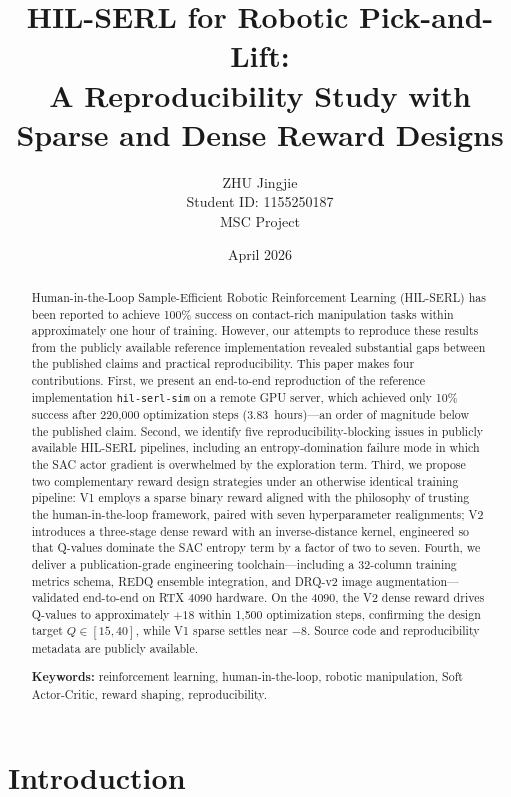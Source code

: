 \documentclass[12pt,a4paper]{article}
\title{\textbf{HIL-SERL for Robotic Pick-and-Lift:\\
A Reproducibility Study with Sparse and Dense Reward Designs}}
\author{ZHU Jingjie\\
\small Student ID: 1155250187\\
\small MSC Project}
\date{April 2026}
\begin{document}
\maketitle

\begin{abstract}
\noindent
Human-in-the-Loop Sample-Efficient Robotic Reinforcement Learning (HIL-SERL) has been reported to achieve 100\% success on contact-rich manipulation tasks within approximately one hour of training. However, our attempts to reproduce these results from the publicly available reference implementation revealed substantial gaps between the published claims and practical reproducibility. This paper makes four contributions. First, we present an end-to-end reproduction of the reference implementation \texttt{hil-serl-sim} on a remote GPU server, which achieved only 10\% success after 220{,}000 optimization steps (3.83~hours)---an order of magnitude below the published claim. Second, we identify five reproducibility-blocking issues in publicly available HIL-SERL pipelines, including an entropy-domination failure mode in which the SAC actor gradient is overwhelmed by the exploration term. Third, we propose two complementary reward design strategies under an otherwise identical training pipeline: V1 employs a sparse binary reward aligned with the philosophy of trusting the human-in-the-loop framework, paired with seven hyperparameter realignments; V2 introduces a three-stage dense reward with an inverse-distance kernel, engineered so that Q-values dominate the SAC entropy term by a factor of two to seven. Fourth, we deliver a publication-grade engineering toolchain---including a 32-column training metrics schema, REDQ ensemble integration, and DRQ-v2 image augmentation---validated end-to-end on RTX 4090 hardware. On the 4090, the V2 dense reward drives Q-values to approximately $+18$ within 1{,}500 optimization steps, confirming the design target $Q \in [15, 40]$, while V1 sparse settles near $-8$. Source code and reproducibility metadata are publicly available.

\bigskip
\noindent\textbf{Keywords:} reinforcement learning, human-in-the-loop, robotic manipulation, Soft Actor-Critic, reward shaping, reproducibility.
\end{abstract}

\section{Introduction}
\end{document}
